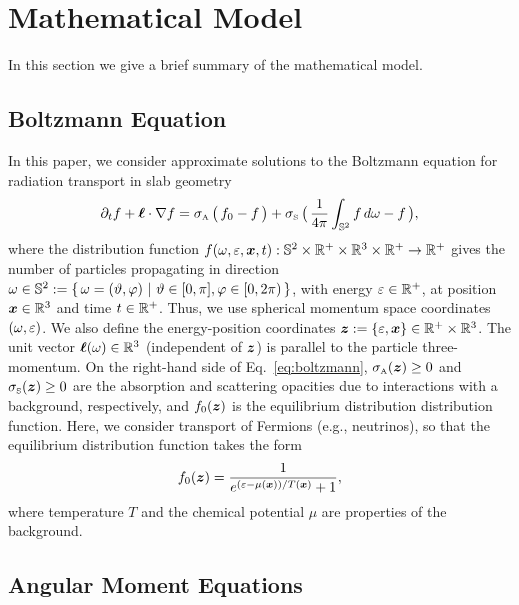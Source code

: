 \section{Mathematical Model}

In this section we give a brief summary of the mathematical model.  

\subsection{Boltzmann Equation}

In this paper, we consider approximate solutions to the Boltzmann equation for radiation transport in slab geometry
\begin{equation}
  \pd{f}{t}+\vect{\ell}\cdot\nabla f
  =\sigma_{\Ab}\,\big(\,f_{0}-f\,\big)
  +\sigma_{\Scatt}\,\big(\,\f{1}{4\pi}\int_{\bbS^{2}}f\,d\omegaNu-f\,\big),
  \label{eq:boltzmann}
\end{equation}
where the distribution function $f(\omega,\varepsilon,\boldsymbol{x},t):\mathbb{S}^{2}\times\mathbb{R}^{+}\times\mathbb{R}^{3}\times\mathbb{R}^{+}\to\mathbb{R}^{+}$ gives the number of particles propagating in direction $\omega\in\mathbb{S}^{2}:=\{\,\omega=(\vartheta,\varphi)~|~\vartheta\in[0,\pi],\varphi\in[0,2\pi)\,\}$, with energy $\varepsilon\in\mathbb{R}^{+}$, at position $\boldsymbol{x}\in\mathbb{R}^{3}$ and time $t\in\mathbb{R}^{+}$.  
Thus, we use spherical momentum space coordinates $(\omega,\varepsilon)$.  
We also define the energy-position coordinates $\boldsymbol{z}:=\{\varepsilon,\boldsymbol{x}\}\in\mathbb{R}^{+}\times\mathbb{R}^{3}$.  
The unit vector $\boldsymbol{\ell}(\omega)\in\mathbb{R}^{3}$ (independent of $\boldsymbol{z}$) is parallel to the particle three-momentum.  
On the right-hand side of Eq.~\eqref{eq:boltzmann}, $\sigma_{\mbox{\tiny A}}(\boldsymbol{z})\ge0$ and $\sigma_{\mbox{\tiny S}}(\boldsymbol{z})\ge0$ are the absorption and scattering opacities due to interactions with a background, respectively, and $f_{0}(\boldsymbol{z})$ is the equilibrium distribution distribution function.  
Here, we consider transport of Fermions (e.g., neutrinos), so that the equilibrium distribution function takes the form
\begin{equation}
  f_{0}(\boldsymbol{z})=\frac{1}{e^{(\varepsilon-\mu(\boldsymbol{x}))/T(\boldsymbol{x})}+1},  
\end{equation}
where temperature $T$ and the chemical potential $\mu$ are properties of the background.  

\subsection{Angular Moment Equations}

